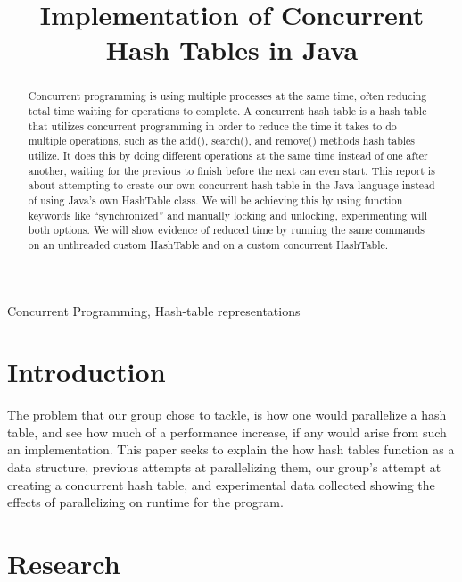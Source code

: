\documentclass[conference]{IEEEtran}
\begin{document}
\title{Implementation of Concurrent Hash Tables in Java}

\author{
\and
{}
\and
{}
}

\maketitle

\begin{abstract}
    Concurrent programming is using multiple processes at the same time, often reducing total time waiting for operations to complete. A concurrent hash table is a hash table that utilizes concurrent programming in order to reduce the time it takes to do multiple operations, such as the add(), search(), and remove() methods hash tables utilize. It does this by doing different operations at the same time instead of one after another, waiting for the previous to finish before the next can even start. This report is about attempting to create our own concurrent hash table in the Java language instead of using Java’s own HashTable class. We will be achieving this by using function keywords like “synchronized” and manually locking and unlocking, experimenting will both options. We will show evidence of reduced time by running the same commands on an unthreaded custom HashTable and on a custom concurrent HashTable.
\end{abstract}

\begin{IEEEkeywords}
Concurrent Programming, Hash-table representations
\end{IEEEkeywords}

\section{Introduction}
The problem that our group chose to tackle, is how one would parallelize a hash table, and see how much of a performance increase,
if any would arise from such an implementation. This paper seeks to explain the how hash tables function as a data structure, previous
attempts at parallelizing them, our group's attempt at creating a concurrent hash table, and experimental data collected showing the
effects of parallelizing on runtime for the program.

\section{Research}
\end{document}

